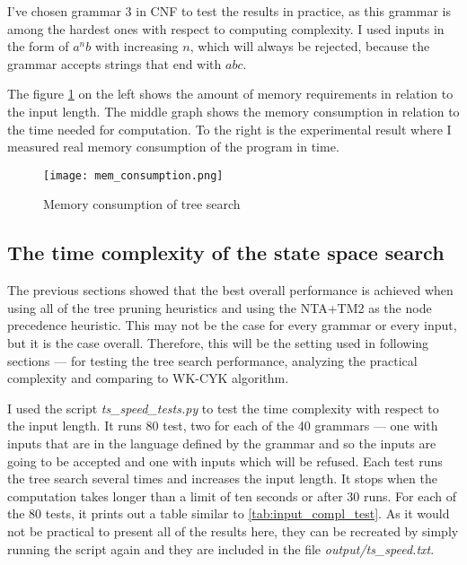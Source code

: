 I've chosen grammar 3 in CNF to test the results in practice, as this grammar is among the hardest ones with respect to computing complexity. I used inputs in the form of $a^nb$ with increasing $n$, which will always be rejected, because the grammar accepts strings that end with $abc$.

The figure \ref{fig:mem_consumption} on the left shows the amount of memory requirements in relation to the input length. The middle graph shows the memory consumption in relation to the time needed for computation. To the right is the experimental result where I measured real memory consumption of the program in time.

\begin{figure}[h]
  \texttt{[image: mem\_consumption.png]}
  \caption{Memory consumption of tree search}
  \label{fig:mem_consumption}
\end{figure}


\subsection{The time complexity of the state space search}
The previous sections showed that the best overall performance is achieved when using all of the tree pruning heuristics and using the NTA+TM2 as the node precedence heuristic. This may not be the case for every grammar or every input, but it is the case overall. Therefore, this will be the setting used in following sections --- for testing the tree search performance, analyzing the practical complexity and comparing to WK-CYK algorithm.

I used the script \textit{ts\_speed\_tests.py} to test the time complexity with respect to the input length. It runs 80 test, two for each of the 40 grammars --- one with inputs that are in the language defined by the grammar and so the inputs are going to be accepted and one with inputs which will be refused. Each test runs the tree search several times and increases the input length. It stops when the computation takes longer than a limit of ten seconds or after 30 runs. For each of the 80 tests, it prints out a table similar to \ref{tab:input_compl_test}. As it would not be practical to present all of the results here, they can be recreated by simply running the script again and they are included in the file \textit{output/ts\_speed.txt}.

